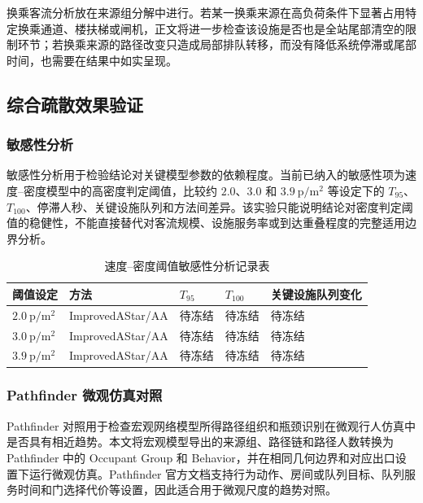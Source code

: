 \documentclass[UTF8,a4paper,12pt]{ctexart}
\begin{document}
换乘客流分析放在来源组分解中进行。若某一换乘来源在高负荷条件下显著占用特定换乘通道、楼扶梯或闸机，正文将进一步检查该设施是否也是全站尾部清空的限制环节；若换乘来源的路径改变只造成局部排队转移，而没有降低系统停滞或尾部时间，也需要在结果中如实呈现。

\subsection{综合疏散效果验证}

\subsubsection{敏感性分析}

敏感性分析用于检验结论对关键模型参数的依赖程度。当前已纳入的敏感性项为速度--密度模型中的高密度判定阈值，比较约 \(2.0\)、\(3.0\) 和 \(3.9\ \mathrm{p/m^2}\) 等设定下的 \(T_{95}\)、\(T_{100}\)、停滞人秒、关键设施队列和方法间差异。该实验只能说明结论对密度判定阈值的稳健性，不能直接替代对客流规模、设施服务率或到达重叠程度的完整适用边界分析。

\begin{table}[htbp]
\centering
\caption{速度--密度阈值敏感性分析记录表}
\small
\begin{tabular}{p{}p{}p{}p{}p{}}
\toprule
阈值设定 & 方法 & \(T_{95}\) & \(T_{100}\) & 关键设施队列变化 \\
\midrule
\(2.0\ \mathrm{p/m^2}\) & ImprovedAStar/AA & 待冻结 & 待冻结 & 待冻结 \\
\(3.0\ \mathrm{p/m^2}\) & ImprovedAStar/AA & 待冻结 & 待冻结 & 待冻结 \\
\(3.9\ \mathrm{p/m^2}\) & ImprovedAStar/AA & 待冻结 & 待冻结 & 待冻结 \\
\bottomrule
\end{tabular}
\end{table}

\subsubsection{Pathfinder 微观仿真对照}

Pathfinder 对照用于检查宏观网络模型所得路径组织和瓶颈识别在微观行人仿真中是否具有相近趋势。本文将宏观模型导出的来源组、路径链和路径人数转换为 Pathfinder 中的 Occupant Group 和 Behavior，并在相同几何边界和对应出口设置下运行微观仿真。Pathfinder 官方文档支持行为动作、房间或队列目标、队列服务时间和门选择代价等设置，因此适合用于微观尺度的趋势对照。
\end{document}
